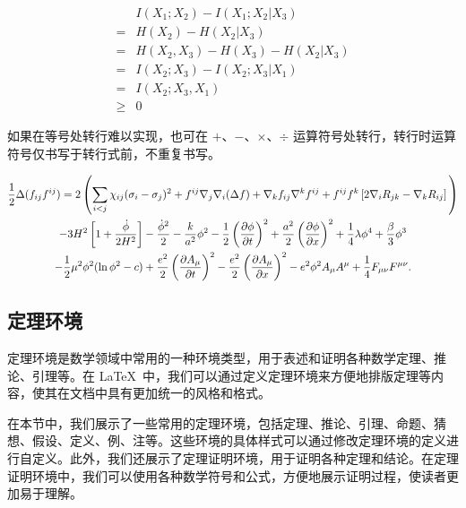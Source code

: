 \begin{align}
         & I(X_1;X_2)-I(X_1;X_2|X_3) \nonumber    \\
    =    & H(X_2)-H(X_2|X_3) \nonumber            \\
    =    & H(X_2,X_3)-H(X_3)-H(X_2|X_3) \nonumber \\
    =    & I(X_2;X_3)-I(X_2;X_3|X_1) \nonumber    \\
    =    & I(X_2;X_3,X_1) \nonumber               \\
    \geq & 0
\end{align}

如果在等号处转行难以实现，也可在 $+$、$-$、$\times$、$\div$ 运算符号处转行，转行时运算符号仅书写于转行式前，不重复书写。

\begin{multline}
    \frac{1}{2} \Delta (f_{ij} f^{ij}) =
    2 \left(\sum_{i<j} \chi_{ij}(\sigma_{i} - \sigma_{j})^{2}
    + f^{ij} \nabla_{j} \nabla_{i} (\Delta f)  + \nabla_{k} f_{ij} \nabla^{k} f^{ij} +
    f^{ij} f^{k} \left[2\nabla_{i}R_{jk}- \nabla_{k} R_{ij} \right] \vphantom{\sum_{i<j}} \right) \\
    - 3H^{2}\left[1+\frac{\dot{\phi}}{2H^2}\right] - \frac{\dot{\phi}^{2}}{2} - \frac{k}{a^{2}}\phi^{2} - \frac{1}{2}\left(\frac{\partial\phi}{\partial t}\right)^{2} + \frac{a^2}{2}\left(\frac{\partial\phi}{\partial x}\right)^{2}
    + \frac{1}{4}\lambda\phi^{4} + \frac{\beta}{3}\phi^{3} \\
    -\frac{1}{2}\mu^{2}\phi^{2}(\ln{\phi^{2}} - c)
    + \frac{e^{2}}{2}\left(\frac{\partial A_{\mu}}{\partial t}\right)^{2} - \frac{e^{2}}{2}\left(\frac{\partial A_{\mu}}{\partial x}\right)^{2}
    - e^{2}\phi^{2}A_{\mu}A^{\mu} + \frac{1}{4}F_{\mu\nu}F^{\mu\nu}.
\end{multline}

\subsection{定理环境}

定理环境是数学领域中常用的一种环境类型，用于表述和证明各种数学定理、推论、引理等。在 \LaTeX\ 中，我们可以通过定义定理环境来方便地排版定理等内容，使其在文档中具有更加统一的风格和格式。

在本节中，我们展示了一些常用的定理环境，包括定理、推论、引理、命题、猜想、假设、定义、例、注等。这些环境的具体样式可以通过修改定理环境的定义进行自定义。此外，我们还展示了定理证明环境，用于证明各种定理和结论。在定理证明环境中，我们可以使用各种数学符号和公式，方便地展示证明过程，使读者更加易于理解。

